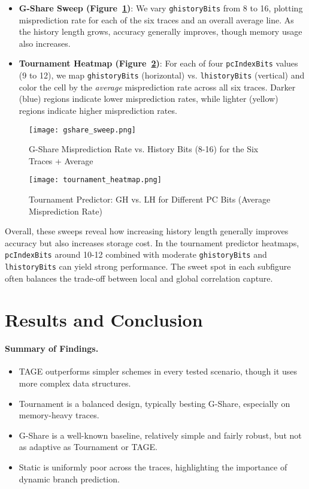 \documentclass[11pt]{article}
\begin{document}
\begin{itemize}
    \item \textbf{G-Share Sweep (Figure~\ref{fig:gshare_sweep})}: We vary \texttt{ghistoryBits} from 8 to 16, plotting misprediction rate for each of the six traces and an overall average line. As the history length grows, accuracy generally improves, though memory usage also increases.
    \item \textbf{Tournament Heatmap (Figure~\ref{fig:tourn_heatmap})}: For each of four \texttt{pcIndexBits} values (9 to 12), we map \texttt{ghistoryBits} (horizontal) vs. \texttt{lhistoryBits} (vertical) and color the cell by the \emph{average} misprediction rate across all six traces. Darker (blue) regions indicate lower misprediction rates, while lighter (yellow) regions indicate higher misprediction rates.
\end{itemize}

\begin{figure}[H]
  \centering
  \texttt{[image: gshare\_sweep.png]}
  \caption{G-Share Misprediction Rate vs. History Bits (8-16) for the Six Traces + Average}
  \label{fig:gshare_sweep}
\end{figure}

\begin{figure}[H]
  \centering
  \texttt{[image: tournament\_heatmap.png]}
  \caption{Tournament Predictor: GH vs. LH for Different PC Bits (Average Misprediction Rate)}
  \label{fig:tourn_heatmap}
\end{figure}

Overall, these sweeps reveal how increasing history length generally improves accuracy but also increases storage cost. In the tournament predictor heatmaps, \texttt{pcIndexBits} around 10-12 combined with moderate \texttt{ghistoryBits} and \texttt{lhistoryBits} can yield strong performance. The sweet spot in each subfigure often balances the trade-off between local and global correlation capture.

\section{Results and Conclusion}

\paragraph{Summary of Findings.}
\begin{itemize}
    \item TAGE outperforms simpler schemes in every tested scenario, though it uses more complex data structures.
    \item Tournament is a balanced design, typically besting G-Share, especially on memory-heavy traces.
    \item G-Share is a well-known baseline, relatively simple and fairly robust, but not as adaptive as Tournament or TAGE.
    \item Static is uniformly poor across the traces, highlighting the importance of dynamic branch prediction.
\end{itemize}
\end{document}
